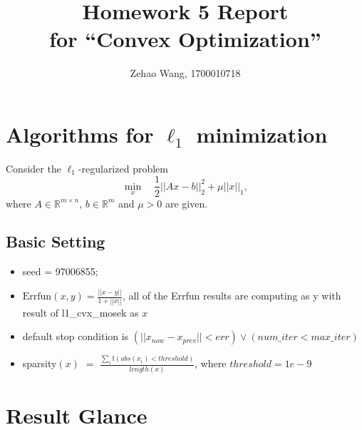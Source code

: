 \documentclass[]{article}
\title{Homework 5 Report \\ \large{for “Convex Optimization”}}
\author{Zehao Wang, 1700010718}
\begin{document}
\maketitle

\section*{Algorithms for $\ell_1$ minimization}
\noindent
Consider the $\ell_1$-regularized problem
\begin{equation}\label{l1}
	\min_x\quad \frac{1}{2}||Ax-b||_2^2 + \mu||x||_1,
\end{equation}
where $A\in\mathbb{R}^{m\times n}$, $b\in \mathbb{R}^m$ and $\mu > 0$ are given.

\subsection*{Basic Setting}
\begin{itemize}
	\item seed = 97006855;
	\item $\text{Errfun}(x,y) = \frac{||x-y||}{1+||x||}$, all of the Errfun results are computing as y with result of l1\_cvx\_mosek as $x$
	\item default stop condition is $(||x_{now}-x_{prev}|| < err) \vee (num\_iter < max\_iter)$ 
	\item sparsity$(x)$ $=$ $\frac{\sum_i\mathbb{I}(abs(x_i) < threshold)}{length(x)}$, where $threshold = 1e-9$
\end{itemize}

\newpage

\section*{Result Glance}
\end{document}
